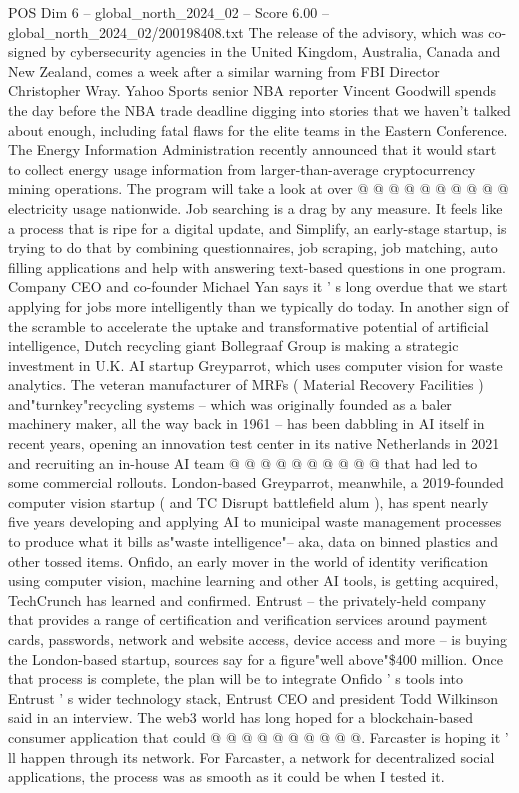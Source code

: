 \begin{textsample}{POS Dim 6 – global\_north\_2024\_02 – Score 6.00 – global\_north\_2024\_02/200198408.txt}
The release of the advisory, which was co-signed by cybersecurity agencies in the United Kingdom, Australia, Canada and New Zealand, comes a week after a similar warning from FBI Director Christopher Wray.
Yahoo Sports senior NBA reporter Vincent Goodwill spends the day before the NBA trade deadline digging into stories that we haven't talked about enough, including fatal flaws for the elite teams in the Eastern Conference.
The Energy Information Administration recently announced that it would start to collect energy usage information from larger-than-average cryptocurrency mining operations.
The program will take a look at over @ @ @ @ @ @ @ @ @ @ electricity usage nationwide.
Job searching is a drag by any measure.
It feels like a process that is ripe for a digital update, and Simplify, an early-stage startup, is trying to do that by combining questionnaires, job scraping, job matching, auto filling applications and help with answering text-based questions in one program.
Company CEO and co-founder Michael Yan says it ' s long overdue that we start applying for jobs more intelligently than we typically do today.
In another sign of the scramble to accelerate the uptake and transformative potential of artificial intelligence, Dutch recycling giant Bollegraaf Group is making a strategic investment in U.K.
AI startup Greyparrot, which uses computer vision for waste analytics.
The veteran manufacturer of MRFs ( Material Recovery Facilities ) and"turnkey"recycling systems -- which was originally founded as a baler machinery maker, all the way back in 1961 -- has been dabbling in AI itself in recent years, opening an innovation test center in its native Netherlands in 2021 and recruiting an in-house AI team @ @ @ @ @ @ @ @ @ @ that had led to some commercial rollouts.
London-based Greyparrot, meanwhile, a 2019-founded computer vision startup ( and TC Disrupt battlefield alum ), has spent nearly five years developing and applying AI to municipal waste management processes to produce what it bills as"waste intelligence"-- aka, data on binned plastics and other tossed items.
Onfido, an early mover in the world of identity verification using computer vision, machine learning and other AI tools, is getting acquired, TechCrunch has learned and confirmed.
Entrust -- the privately-held company that provides a range of certification and verification services around payment cards, passwords, network and website access, device access and more -- is buying the London-based startup, sources say for a figure"well above"\$400 million.
Once that process is complete, the plan will be to integrate Onfido ' s tools into Entrust ' s wider technology stack, Entrust CEO and president Todd Wilkinson said in an interview.
The web3 world has long hoped for a blockchain-based consumer application that could @ @ @ @ @ @ @ @ @ @.
Farcaster is hoping it ' ll happen through its network.
For Farcaster, a network for decentralized social applications, the process was as smooth as it could be when I tested it.

\end{textsample}
